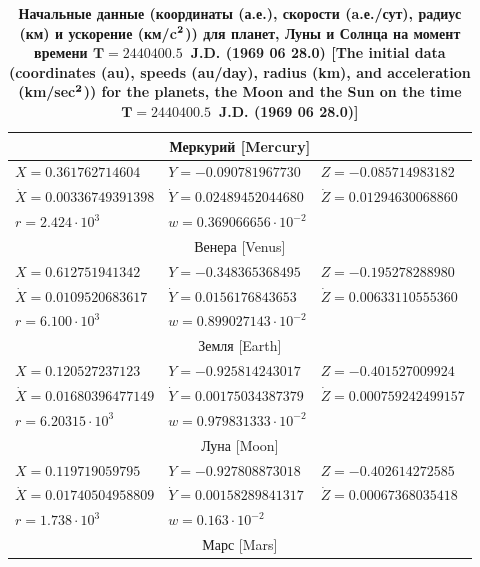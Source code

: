 \begin{table}[p]

\vspace{-5mm}

\center \small
\begin{minipage}[t]{132mm}
\caption{\bf Начальные данные (координаты (а.е.),  скорости (a.е./сут), радиус (км) и ускорение (км/c$\bf ^2$)) для планет, Луны и Солнца на момент времени $\boldsymbol{T=2440400.5}$~J.D. (1969 06 28.0) 
[The initial data (coordinates (au), speeds (au/day), radius (km), and acceleration (km/sec$\bf ^2 $)) for the planets, the Moon and the Sun on the time $\boldsymbol{T=2440400.5}$~J.D. (1969 06 28.0)]
\vspace{-3mm}}
\begin{tabular}{lll}
\hline
\multicolumn{3}{c}{			Меркурий	[Mercury]	}	\\ \hline
$X=	0.361762714604	$	&	$Y=	-0.090781967730	$	&	$Z=	-0.085714983182	$	\\
$\dot{X}=	0.00336749391398	$	&	$\dot{Y}=	0.02489452044680	$	&	$\dot{Z}=	0.01294630068860	$	\\
$r=	2.424 \cdot 10^3	$	&	$w=	0.369066656 \cdot  10^{-2}	$	&				\\ \hline
\multicolumn{3}{c}{				Венера	[Venus]		}\\ \hline
$X=	0.612751941342	$	&	$Y=	-0.348365368495	$	&	$Z=	-0.195278288980	$	\\
$\dot{X}=	0.0109520683617	$	&	$\dot{Y}=	0.0156176843653	$	&	$\dot{Z}=	0.00633110555360	$	\\
$r=	6.100 \cdot 10^3	$	&	$w = 0.899027143 \cdot  10^{-2}	$	&				\\ \hline
\multicolumn{3}{c}{			Земля	[Earth]		}	\\ \hline
$X=	0.120527237123	$	&	$Y=	-0.925814243017	$	&	$Z=	-0.401527009924	$	\\
$\dot{X}=	0.01680396477149	$	&	$\dot{Y}=	0.00175034387379	$	&	$\dot{Z}=	0.000759242499157	$	\\
$r=	6.20315 \cdot 10^3	$	&	$w = 0.979831333\cdot  10^{-2}	$	&				\\ \hline
\multicolumn{3}{c}{	Луна	[Moon]		}				\\ \hline
$X=	0.119719059795	$	&	$Y=	-0.927808873018	$	&	$Z=	-0.402614272585	$	\\
$\dot{X}=	0.01740504958809	$	&	$\dot{Y}=	0.00158289841317	$	&	$\dot{Z}=	0.00067368035418	$	\\
$r=	1.738 \cdot 10^3	$	&	$w = 0.163\cdot  10^{-2}	$	&				\\ \hline
\multicolumn{3}{c}{	Марс	[Mars]			}	\\ \hline

\end{tabular}
\end{minipage}
\end{table}
